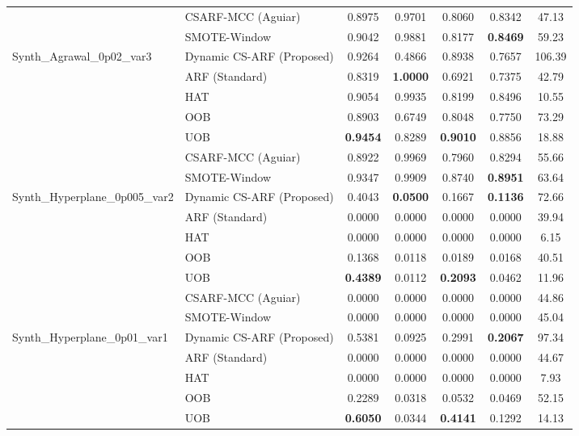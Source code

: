\begin{longtable}{|l|l|c|c|c|c|c|}
 & CSARF-MCC (Aguiar) & 0.8975 & 0.9701 & 0.8060 & 0.8342 & 47.13 \\ \cline{2-7}
 & SMOTE-Window & 0.9042 & 0.9881 & 0.8177 & \textbf{0.8469} & 59.23 \\ \hline
\multirow{7}{*}{Synth_Agrawal_0p02_var3} & Dynamic CS-ARF (Proposed) & 0.9264 & 0.4866 & 0.8938 & 0.7657 & 106.39 \\ \cline{2-7}
 & ARF (Standard) & 0.8319 & \textbf{1.0000} & 0.6921 & 0.7375 & 42.79 \\ \cline{2-7}
 & HAT & 0.9054 & 0.9935 & 0.8199 & 0.8496 & 10.55 \\ \cline{2-7}
 & OOB & 0.8903 & 0.6749 & 0.8048 & 0.7750 & 73.29 \\ \cline{2-7}
 & UOB & \textbf{0.9454} & 0.8289 & \textbf{0.9010} & 0.8856 & 18.88 \\ \cline{2-7}
 & CSARF-MCC (Aguiar) & 0.8922 & 0.9969 & 0.7960 & 0.8294 & 55.66 \\ \cline{2-7}
 & SMOTE-Window & 0.9347 & 0.9909 & 0.8740 & \textbf{0.8951} & 63.64 \\ \hline
\multirow{7}{*}{Synth_Hyperplane_0p005_var2} & Dynamic CS-ARF (Proposed) & 0.4043 & \textbf{0.0500} & 0.1667 & \textbf{0.1136} & 72.66 \\ \cline{2-7}
 & ARF (Standard) & 0.0000 & 0.0000 & 0.0000 & 0.0000 & 39.94 \\ \cline{2-7}
 & HAT & 0.0000 & 0.0000 & 0.0000 & 0.0000 & 6.15 \\ \cline{2-7}
 & OOB & 0.1368 & 0.0118 & 0.0189 & 0.0168 & 40.51 \\ \cline{2-7}
 & UOB & \textbf{0.4389} & 0.0112 & \textbf{0.2093} & 0.0462 & 11.96 \\ \cline{2-7}
 & CSARF-MCC (Aguiar) & 0.0000 & 0.0000 & 0.0000 & 0.0000 & 44.86 \\ \cline{2-7}
 & SMOTE-Window & 0.0000 & 0.0000 & 0.0000 & 0.0000 & 45.04 \\ \hline
\multirow{7}{*}{Synth_Hyperplane_0p01_var1} & Dynamic CS-ARF (Proposed) & 0.5381 & 0.0925 & 0.2991 & \textbf{0.2067} & 97.34 \\ \cline{2-7}
 & ARF (Standard) & 0.0000 & 0.0000 & 0.0000 & 0.0000 & 44.67 \\ \cline{2-7}
 & HAT & 0.0000 & 0.0000 & 0.0000 & 0.0000 & 7.93 \\ \cline{2-7}
 & OOB & 0.2289 & 0.0318 & 0.0532 & 0.0469 & 52.15 \\ \cline{2-7}
 & UOB & \textbf{0.6050} & 0.0344 & \textbf{0.4141} & 0.1292 & 14.13 \\ \cline{2-7}

\end{longtable}
